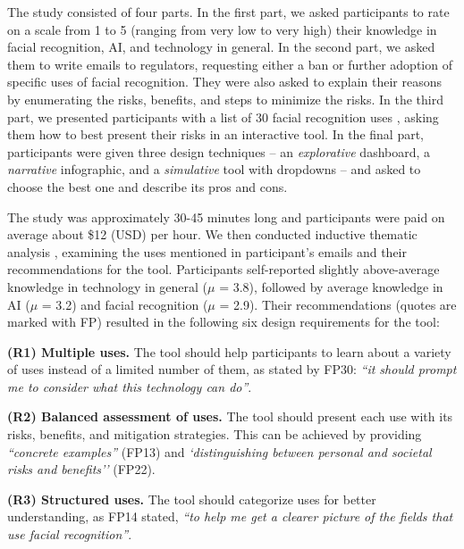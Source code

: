 The study consisted of four parts. In the first part, we asked participants to rate on a scale from 1 to 5 (ranging from very low to very high) their knowledge in facial recognition, AI, and technology in general. In the second part, we asked them to write emails to regulators, requesting either a ban or further adoption of specific uses of facial recognition. They were also asked to explain their reasons by enumerating the risks, benefits, and steps to minimize the risks. In the third part, we presented participants with a list of 30 facial recognition uses \cite{facialRecognitionReview, Roberts2023_animals}, asking them how to best present their risks in an interactive tool. In the final part, participants were given three design techniques -- an \emph{explorative} dashboard, a \emph{narrative} infographic, and a \emph{simulative} tool with dropdowns -- and asked to choose the best one and describe its pros and cons. 

The study was approximately 30-45 minutes long and participants were paid on average about \$12 (USD) per hour. We then conducted inductive thematic analysis \cite{miles1994qualitative}, examining the uses mentioned in participant's emails and their recommendations for the tool. Participants self-reported slightly above-average knowledge in technology in general ($\mu$ = 3.8), followed by average knowledge in AI ($\mu$ = 3.2) and facial recognition ($\mu$ = 2.9). Their recommendations (quotes are marked with FP) resulted in the following six design requirements for the tool:

\vspace{1.25pt}
\noindent\textbf{(R1) Multiple uses.}
The tool should help participants to learn about a variety of uses instead of a limited number of them, as stated by FP30: \emph{``it should prompt me to consider what this technology can do''}. 

\vspace{1.25pt}
\noindent\textbf{(R2) Balanced assessment of uses.}
The tool should present each use with its risks, benefits, and mitigation strategies. This can be achieved by providing  \emph{``concrete examples''} (FP13) and \emph{`distinguishing between personal and societal risks and benefits''} (FP22).

\vspace{1.25pt}
\noindent\textbf{(R3) Structured uses.}
The tool should categorize uses for better understanding, as FP14 stated, \emph{``to help me get a clearer picture of the fields that use facial recognition''}.

